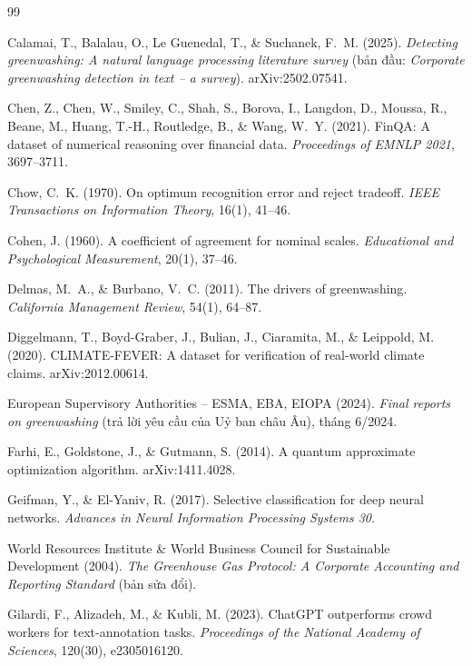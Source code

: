 \begin{thebibliography}{99}
\small
\setlength{\itemsep}{2pt}

 Calamai, T., Balalau, O., Le Guenedal, T., \& Suchanek, F.~M. (2025). \emph{Detecting greenwashing: A natural language processing literature survey} (bản đầu: \emph{Corporate greenwashing detection in text – a survey}). arXiv:2502.07541.

 Chen, Z., Chen, W., Smiley, C., Shah, S., Borova, I., Langdon, D., Moussa, R., Beane, M., Huang, T.-H., Routledge, B., \& Wang, W.~Y. (2021). FinQA: A dataset of numerical reasoning over financial data. \emph{Proceedings of EMNLP 2021}, 3697–3711.

 Chow, C.~K. (1970). On optimum recognition error and reject tradeoff. \emph{IEEE Transactions on Information Theory}, 16(1), 41–46.

 Cohen, J. (1960). A coefficient of agreement for nominal scales. \emph{Educational and Psychological Measurement}, 20(1), 37–46.

 Delmas, M.~A., \& Burbano, V.~C. (2011). The drivers of greenwashing. \emph{California Management Review}, 54(1), 64–87.

 Diggelmann, T., Boyd-Graber, J., Bulian, J., Ciaramita, M., \& Leippold, M. (2020). CLIMATE-FEVER: A dataset for verification of real-world climate claims. arXiv:2012.00614.

 European Supervisory Authorities – ESMA, EBA, EIOPA (2024). \emph{Final reports on greenwashing} (trả lời yêu cầu của Uỷ ban châu Âu), tháng 6/2024.

 Farhi, E., Goldstone, J., \& Gutmann, S. (2014). A quantum approximate optimization algorithm. arXiv:1411.4028.

 Geifman, Y., \& El-Yaniv, R. (2017). Selective classification for deep neural networks. \emph{Advances in Neural Information Processing Systems 30}.

 World Resources Institute \& World Business Council for Sustainable Development (2004). \emph{The Greenhouse Gas Protocol: A Corporate Accounting and Reporting Standard} (bản sửa đổi).

 Gilardi, F., Alizadeh, M., \& Kubli, M. (2023). ChatGPT outperforms crowd workers for text-annotation tasks. \emph{Proceedings of the National Academy of Sciences}, 120(30), e2305016120.


\end{thebibliography}
